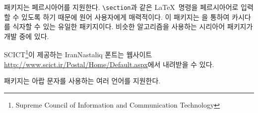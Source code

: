 \cite{xepersian} 패키지는 페르시아어를 지원한다.
\verb|\section|과 같은 \LaTeX\ 명령을 페르시아어로 입력할 수 있도록 하기 때문에
원어 사용자에게 매력적이다. 이 패키지는 을 통하여 카시다%
%
를 식자할 수 있는 유일한 패키지이다. 
비슷한 알고리즘을 사용하는 시리아어 패키지가 개발 중에 있다.

SCICT\footnote{Supreme Council of Information and Communication Technology}이 제공하는
IranNastaliq 폰트는 웹사이트 \url{http://www.scict.ir/Postal/Home/Default.aspx}에서 내려받을 수 있다.

\cite{arabxetex} 패키지는 아랍 문자를 사용하는 여러 언어를 지원한다.

